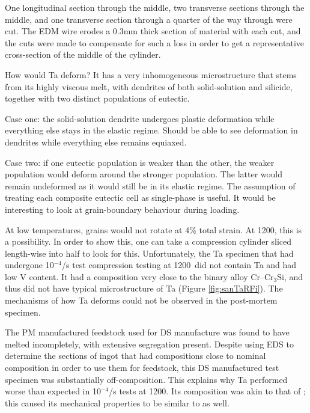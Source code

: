 One longitudinal section through the middle, two transverse sections through the middle, and one transverse section through a quarter of the way through were cut.  The EDM wire erodes a 0.3mm thick section of material with each cut, and the cuts were made to compensate for such a loss in order to get a representative cross-section of the middle of the cylinder.

How would Ta deform? It has a very inhomogeneous microstructure that stems from its highly viscous melt, with dendrites of both solid-solution and silicide, together with two distinct populations of eutectic. 

Case one: the solid-solution dendrite undergoes plastic deformation while everything else stays in the elastic regime.  Should be able to see deformation in dendrites while everything else remains equiaxed.

Case two: if one eutectic population is weaker than the other, the weaker population would deform around the stronger population.  The latter would remain undeformed as it would still be in its elastic regime. The assumption of treating each composite eutectic cell as single-phase is useful.  It would be interesting to look at grain-boundary behaviour during loading.

At low temperatures, grains would not rotate at 4\% total strain.  At 1200\celsius, this is a possibility.  In order to show this, one can take a compression cylinder sliced length-wise into half to look for this.  Unfortunately, the Ta specimen that had undergone 10$^{-4}$/s test compression testing at 1200\celsius\ did not contain Ta and had low V content.  It had a composition very close to the binary alloy Cr--Cr$_3$Si, and thus did not have typical microstructure of Ta (Figure \ref{fig:sanTaRFi}).  The mechanisms of how Ta deforms could not be observed in the post-mortem specimen.  

The PM manufactured feedstock used for DS manufacture was found to have melted incompletely, with extensive segregation present.  Despite using EDS to determine the sections of ingot that had compositions close to nominal composition in order to use them for feedstock, this DS manufactured test specimen was substantially off-composition.  This explains why Ta performed worse than expected in 10$^{-4}$/s tests at 1200\celsius.  Its composition was akin to that of ; this caused its mechanical properties to be similar to  as well.

